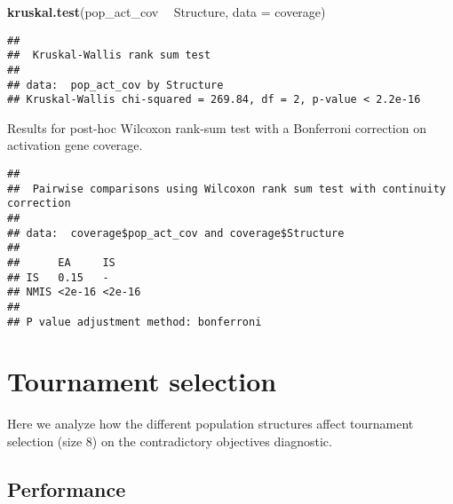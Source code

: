 \documentclass[]{book}
\newenvironment{Shaded}{\begin{snugshade}}{\end{snugshade}}
\newcommand{\DataTypeTok}[1]{\textcolor[rgb]{0.13,0.29,0.53}{#1}}
\newcommand{\KeywordTok}[1]{\textcolor[rgb]{0.13,0.29,0.53}{\textbf{#1}}}
\newcommand{\NormalTok}[1]{#1}
\newcommand{\OperatorTok}[1]{\textcolor[rgb]{0.81,0.36,0.00}{\textbf{#1}}}
\newcommand{\OtherTok}[1]{\textcolor[rgb]{0.56,0.35,0.01}{#1}}
\newcommand{\StringTok}[1]{\textcolor[rgb]{0.31,0.60,0.02}{#1}}
\begin{document}
\begin{Shaded}
\begin{Highlighting}[]
\KeywordTok{kruskal.test}\NormalTok{(pop_act_cov }\OperatorTok{~}\StringTok{ }\NormalTok{Structure, }\DataTypeTok{data =}\NormalTok{ coverage)}
\end{Highlighting}
\end{Shaded}

\begin{verbatim}
## 
##  Kruskal-Wallis rank sum test
## 
## data:  pop_act_cov by Structure
## Kruskal-Wallis chi-squared = 269.84, df = 2, p-value < 2.2e-16
\end{verbatim}

Results for post-hoc Wilcoxon rank-sum test with a Bonferroni correction on activation gene coverage.

\begin{Shaded}
\end{Shaded}

\begin{verbatim}
## 
##  Pairwise comparisons using Wilcoxon rank sum test with continuity correction 
## 
## data:  coverage$pop_act_cov and coverage$Structure 
## 
##      EA     IS    
## IS   0.15   -     
## NMIS <2e-16 <2e-16
## 
## P value adjustment method: bonferroni
\end{verbatim}

\hypertarget{tournament-selection-11}{%
\section{Tournament selection}\label{tournament-selection-11}}

Here we analyze how the different population structures affect tournament selection (size 8) on the contradictory objectives diagnostic.

\hypertarget{performance-7}{%
\subsection{Performance}\label{performance-7}}
\end{document}
